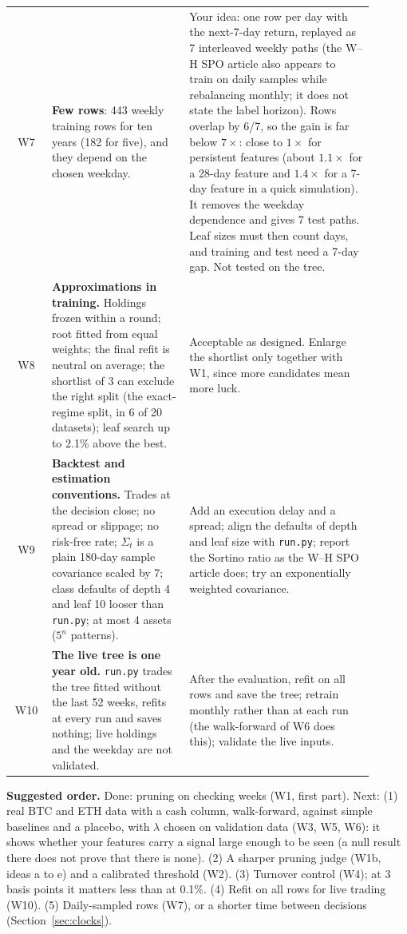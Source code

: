 \documentclass[11pt,a4paper]{article}
\newcommand{\1}{\mathbf{1}}
\begin{document}
\begin{longtable}{@{}c >{\raggedright\arraybackslash}p{0.385\linewidth} >{\raggedright\arraybackslash}p{0.515\linewidth}@{}}
\addlinespace
W7 & \textbf{Few rows}: 443 weekly training rows for ten years (182 for five), and they depend on the chosen weekday. & Your idea: one row per day with the next-7-day return, replayed as 7 interleaved weekly paths (the W--H SPO article also appears to train on daily samples while rebalancing monthly; it does not state the label horizon). Rows overlap by 6/7, so the gain is far below $7\times$: close to $1\times$ for persistent features (about $1.1\times$ for a 28-day feature and $1.4\times$ for a 7-day feature in a quick simulation). It removes the weekday dependence and gives 7 test paths. Leaf sizes must then count days, and training and test need a 7-day gap. Not tested on the tree.\\
\addlinespace
W8 & \textbf{Approximations in training.} Holdings frozen within a round; root fitted from equal weights; the final refit is neutral on average; the shortlist of 3 can exclude the right split (the exact-regime split, in 6 of 20 datasets); leaf search up to 2.1\% above the best. & Acceptable as designed. Enlarge the shortlist only together with W1, since more candidates mean more luck.\\
\addlinespace
W9 & \textbf{Backtest and estimation conventions.} Trades at the decision close; no spread or slippage; no risk-free rate; $\Sigma_t$ is a plain 180-day sample covariance scaled by 7; class defaults of depth 4 and leaf 10 looser than \texttt{run.py}; at most 4 assets ($5^n$ patterns). & Add an execution delay and a spread; align the defaults of depth and leaf size with \texttt{run.py}; report the Sortino ratio as the W--H SPO article does; try an exponentially weighted covariance.\\
\addlinespace
W10 & \textbf{The live tree is one year old.} \texttt{run.py} trades the tree fitted without the last 52 weeks, refits at every run and saves nothing; live holdings and the weekday are not validated. & After the evaluation, refit on all rows and save the tree; retrain monthly rather than at each run (the walk-forward of W6 does this); validate the live inputs.\\
\end{longtable}
\endgroup

\textbf{Suggested order.} Done: pruning on checking weeks (W1, first part). Next: (1) real BTC and ETH data with a cash column, walk-forward, against simple baselines and a placebo, with $\lambda$ chosen on validation data (W3, W5, W6): it shows whether your features carry a signal large enough to be seen (a null result there does not prove that there is none). (2) A sharper pruning judge (W1b, ideas a to e) and a calibrated threshold (W2). (3) Turnover control (W4); at 3 basis points it matters less than at 0.1\%. (4) Refit on all rows for live trading (W10). (5) Daily-sampled rows (W7), or a shorter time between decisions (Section~\ref{sec:clocks}).
\end{document}
